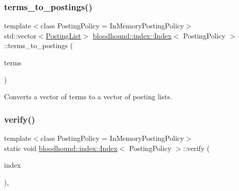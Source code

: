 \subsubsection{\texorpdfstring{terms\+\_\+to\+\_\+postings()}{terms\_to\_postings()}}
{\footnotesize\ttfamily template$<$class Posting\+Policy = In\+Memory\+Posting\+Policy$>$ \\
std\+::vector$<$\hyperlink{classbloodhound_1_1PostingList}{Posting\+List}$>$ \hyperlink{classbloodhound_1_1index_1_1Index}{bloodhound\+::index\+::\+Index}$<$ Posting\+Policy $>$\+::terms\+\_\+to\+\_\+postings (\begin{DoxyParamCaption}\item[{const std\+::vector$<$ \hyperlink{structbloodhound_1_1TermId}{Term\+Id} $>$}]{terms }\end{DoxyParamCaption})\hspace{0.3cm}{\ttfamily [inline]}}



Converts a vector of terms to a vector of posting lists. 

\mbox{\label{classbloodhound_1_1index_1_1Index_a6f1e18905c2b5babd30f33467c79018a}} 
\subsubsection{\texorpdfstring{verify()}{verify()}}
{\footnotesize\ttfamily template$<$class Posting\+Policy = In\+Memory\+Posting\+Policy$>$ \\
static void \hyperlink{classbloodhound_1_1index_1_1Index}{bloodhound\+::index\+::\+Index}$<$ Posting\+Policy $>$\+::verify (\begin{DoxyParamCaption}\item[{\hyperlink{classbloodhound_1_1index_1_1Index}{Index}$<$ Posting\+Policy $>$ \&}]{index }\end{DoxyParamCaption})\hspace{0.3cm}{\ttfamily [inline]}, {\ttfamily [static]}}

\mbox{\label{classbloodhound_1_1index_1_1Index_a02e947bdd77e51dcb09db5b7f03f14c7}} 
